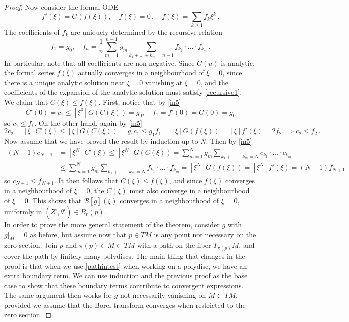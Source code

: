 \documentclass[10pt,a4paper]{amsart}
\begin{document}
\begin{proof}
Now consider the formal ODE
\begin{equation*}
    f'(\xi)=G(f(\xi)), \quad f(\xi)=0\,, \quad f(\xi)=\sum_{k\geq1}f_k\xi^k\,.
\end{equation*}
The coefficients of $f_k$ are uniquely determined by the recursive relation 
\begin{equation}\label{recursive1}
    f_1=g_0, \quad f_n=\frac{1}{n}\sum_{m=1}^{n-1}g_m\sum_{k_1+...+k_m=n-1}f_{k_1}\cdot...\cdot f_{k_m}\,.
\end{equation}
In particular, note that all coefficients are non-negative. Since $G(u)$ is analytic, the formal series $f(\xi)$ actually converges in a neighbourhood of $\xi=0$, since there is a unique analytic solution near $\xi=0$ vanishing at $\xi=0$, and the coefficients of the expansion of the analytic solution must satisfy \eqref{recursive1}.\\ 

We claim that $C(\xi)\leq f(\xi).$ First, notice that by \eqref{in5}
\begin{equation*}
    C'(0)=c_1\leq [\xi^0]G(C(\xi))=g_0, \quad f_1=f'(0)=G(0)=g_0
\end{equation*}
so $c_1\leq f_1.$ On the other hand, again by \eqref{in5}
\begin{equation*}
    2c_2=[\xi]C'(\xi)\leq [\xi]G(C(\xi))=g_1c_1\leq g_1f_1=[\xi]G(f(\xi))=[\xi]f'(\xi)=2f_2 \implies c_2\leq f_2\,.
\end{equation*}
Now assume that we have proved the result by induction up to $N$. Then by \eqref{in5}
\begin{equation*}
\begin{split}
    (N+1)c_{N+1}&=[\xi^{N}]C'(\xi)\leq [\xi^N]G(C(\xi))=\sum_{m=1}^{N}g_m\sum_{k_1+...+k_m=N}c_{k_1}\cdot...\cdot c_{k_m}\\
    &\leq \sum_{m=1}^{N}g_m\sum_{k_1+...+k_m=N}f_{k_1}\cdot...\cdot f_{k_m}=[\xi^N]G(f(\xi))=[\xi^N]f'(\xi)=(N+1)f_{N+1}
\end{split}
\end{equation*}
so $c_{N+1}\leq f_{N+1}. $ It then follows that $C(\xi)\leq f(\xi)$, and since $f(\xi)$ converges in a neighbourhood of $\xi=0$, the $C(\xi)$ must also converge in a neighbourhood of $\xi=0$. This shows that $\mathcal{B}[\dot{g}](\xi)$ converges in a neighbourhood of $\xi=0$, uniformly in $(Z^i,\theta^i)\in B_r(p)$.\\

In order to prove the more general statement of the theorem, consider $\dot{g}$ with $\dot{g}|_M=0$ as before, but assume now that $p\in TM$ is any point not necessary on the zero section. Join $p$ and $\pi(p)\in M\subset TM$ with a path on the fiber $T_{\pi(p)}M$, and cover the path by finitely many polydiscs. The main thing that changes in the proof is that when we use \eqref{pathintest} when working on a polydisc, we have an extra boundary term. We can use induction and the previous proof as the base case to show that these boundary terms contribute to convergent expressions. The same argument then works for $\dot{g}$ not necessarily vanishing on $M\subset TM$, provided we assume that the Borel transform converges when restricted to the zero section. 
\end{proof}
\end{document}
